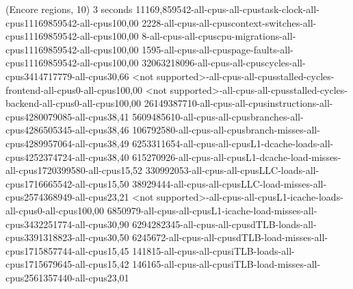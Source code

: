 (Encore regions, 10)
3 seconds
11169,859542-all-cpus-all-cpustask-clock-all-cpus11169859542-all-cpus100,00
2228-all-cpus-all-cpuscontext-switches-all-cpus11169859542-all-cpus100,00
8-all-cpus-all-cpuscpu-migrations-all-cpus11169859542-all-cpus100,00
1595-all-cpus-all-cpuspage-faults-all-cpus11169859542-all-cpus100,00
32063218096-all-cpus-all-cpuscycles-all-cpus3414717779-all-cpus30,66
<not supported>-all-cpus-all-cpusstalled-cycles-frontend-all-cpus0-all-cpus100,00
<not supported>-all-cpus-all-cpusstalled-cycles-backend-all-cpus0-all-cpus100,00
26149387710-all-cpus-all-cpusinstructions-all-cpus4280079085-all-cpus38,41
5609485610-all-cpus-all-cpusbranches-all-cpus4286505345-all-cpus38,46
106792580-all-cpus-all-cpusbranch-misses-all-cpus4289957064-all-cpus38,49
6253311654-all-cpus-all-cpusL1-dcache-loads-all-cpus4252374724-all-cpus38,40
615270926-all-cpus-all-cpusL1-dcache-load-misses-all-cpus1720399580-all-cpus15,52
330992053-all-cpus-all-cpusLLC-loads-all-cpus1716665542-all-cpus15,50
38929444-all-cpus-all-cpusLLC-load-misses-all-cpus2574368949-all-cpus23,21
<not supported>-all-cpus-all-cpusL1-icache-loads-all-cpus0-all-cpus100,00
6850979-all-cpus-all-cpusL1-icache-load-misses-all-cpus3432251774-all-cpus30,90
6294282345-all-cpus-all-cpusdTLB-loads-all-cpus3391318823-all-cpus30,50
6245672-all-cpus-all-cpusdTLB-load-misses-all-cpus1715857744-all-cpus15,45
141815-all-cpus-all-cpusiTLB-loads-all-cpus1715679645-all-cpus15,42
146165-all-cpus-all-cpusiTLB-load-misses-all-cpus2561357440-all-cpus23,01
